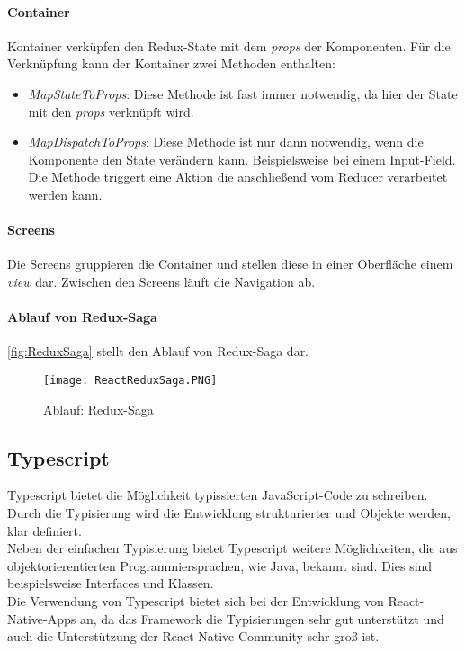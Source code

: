 \paragraph{Container}
Kontainer verküpfen den Redux-State mit dem \textit{props} der Komponenten. Für die Verknüpfung 
kann der Kontainer zwei Methoden enthalten: 
\begin{itemize}
    \item \textit{MapStateToProps}: Diese Methode ist fast immer notwendig, da hier der State mit den \textit{props} verknüpft wird.
    \item \textit{MapDispatchToProps}: Diese Methode ist nur dann notwendig, wenn die Komponente den State verändern kann. Beispielsweise bei einem Input-Field. 
    Die Methode triggert eine Aktion die anschließend vom Reducer verarbeitet werden kann.
\end{itemize}

\paragraph{Screens}
Die Screens gruppieren die Container und stellen diese in einer Oberfläche einem \textit{view} dar. 
Zwischen den Screens läuft die Navigation ab. 

\paragraph{Ablauf von Redux-Saga}
\autoref{fig:ReduxSaga} stellt den Ablauf von Redux-Saga dar. 
\begin{figure}[h]
    \centering
    \texttt{[image: ReactReduxSaga.PNG]}
    \caption{Ablauf: Redux-Saga}
    \label{fig:ReduxSaga}
\end{figure}

\subsection{Typescript}
Typescript bietet die Möglichkeit typissierten JavaScript-Code zu schreiben.
Durch die Typisierung wird die Entwicklung strukturierter und Objekte werden,
klar definiert. \\
Neben der einfachen Typisierung bietet Typescript weitere Möglichkeiten, die aus
objektorierentierten Programmiersprachen, wie Java, bekannt sind. Dies sind beispielsweise
Interfaces und Klassen. \\
Die Verwendung von Typescript bietet sich bei der Entwicklung von React-Native-Apps an,
da das Framework die Typisierungen sehr gut unterstützt und auch die Unterstützung der React-Native-Community sehr groß ist. \cite{TypescriptReasons:online}

